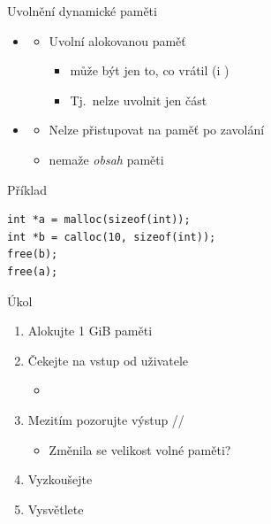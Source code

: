 \begin{frame}[fragile]{Uvolnění dynamické paměti}

  \begin{itemize}
    \item {}
    \begin{itemize}
      \item Uvolní alokovanou paměť
      \begin{itemize}
	\item {} může být jen to, co vrátil  (i
	  )
	\item Tj.\ nelze uvolnit jen část 
      \end{itemize}
    \end{itemize}

    \pause

    \item \pozor
    \begin{itemize}
      \item Nelze přistupovat na paměť po zavolání 

      \pause

      \item {} nemaže \emph{obsah} paměti
    \end{itemize}
  \end{itemize}


  \begin{block}{Příklad}
    \begin{lstlisting}[belowskip=0pt]
int *a = malloc(sizeof(int));
int *b = calloc(10, sizeof(int));
free(b);
free(a);
    \end{lstlisting}
  \end{block}

\end{frame}

\begin{frame}{Úkol}

  \begin{enumerate}
    \item Alokujte 1 GiB paměti
    \item Čekejte na vstup od uživatele
    \begin{itemize}
      \item {}
    \end{itemize}

    \item Mezitím pozorujte výstup //
    \begin{itemize}
      \item Změnila se velikost volné paměti?
    \end{itemize}

    \item Vyzkoušejte
    \item Vysvětlete
  \end{enumerate}

\end{frame}

